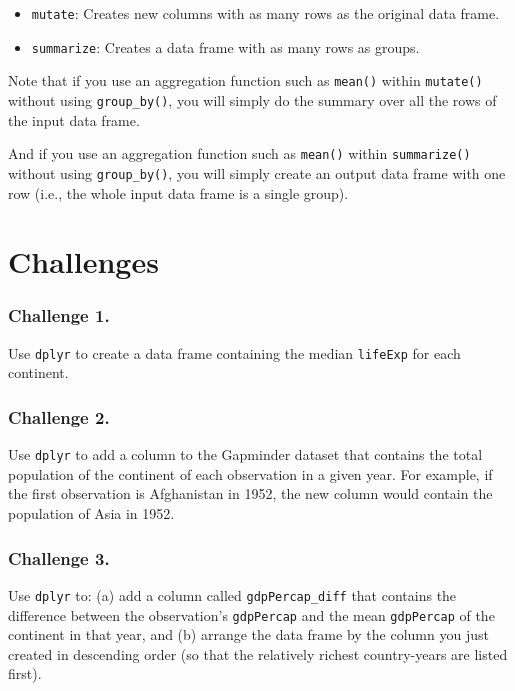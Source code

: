 \documentclass[]{book}
\providecommand{\tightlist}{%
  \setlength{\itemsep}{0pt}\setlength{\parskip}{0pt}}
\begin{document}
\begin{itemize}
\tightlist
\item
  \texttt{mutate}: Creates new columns with as many rows as the original
  data frame.
\item
  \texttt{summarize}: Creates a data frame with as many rows as groups.
\end{itemize}

Note that if you use an aggregation function such as \texttt{mean()}
within \texttt{mutate()} without using \texttt{group\_by()}, you will
simply do the summary over all the rows of the input data frame.

And if you use an aggregation function such as \texttt{mean()} within
\texttt{summarize()} without using \texttt{group\_by()}, you will simply
create an output data frame with one row (i.e., the whole input data
frame is a single group).

\section{Challenges}\label{challenges-6}

\subsubsection*{Challenge 1.}\label{challenge-1.-3}

Use \texttt{dplyr} to create a data frame containing the median
\texttt{lifeExp} for each continent.

\subsubsection*{Challenge 2.}\label{challenge-2.-2}

Use \texttt{dplyr} to add a column to the Gapminder dataset that
contains the total population of the continent of each observation in a
given year. For example, if the first observation is Afghanistan in
1952, the new column would contain the population of Asia in 1952.

\subsubsection*{Challenge 3.}\label{challenge-3.-2}

Use \texttt{dplyr} to: (a) add a column called \texttt{gdpPercap\_diff}
that contains the difference between the observation's
\texttt{gdpPercap} and the mean \texttt{gdpPercap} of the continent in
that year, and (b) arrange the data frame by the column you just created
in descending order (so that the relatively richest country-years are
listed first).
\end{document}
